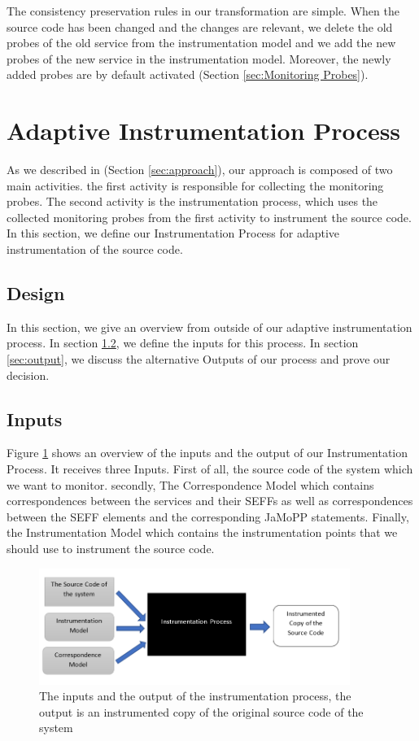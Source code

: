 The consistency preservation rules in our transformation are simple. When the source code has been changed and the changes are relevant, we delete the old probes of the old service from the instrumentation model and we add the new probes of the new service in the instrumentation model. Moreover, the newly added probes are by default activated (Section \ref{sec:Monitoring Probes}). 

\section{Adaptive Instrumentation Process}
\label{sec:Adaptive Instrumentation Process}
As we described in (Section \ref{sec:approach}), our approach is composed of two main activities. the first activity is responsible for collecting the monitoring probes. The second activity is the instrumentation process, which uses the collected monitoring probes from the first activity to instrument the source code. In this section, we define our Instrumentation Process for adaptive instrumentation of the source code.
 
\subsection{Design}
\label{sec:Design}
In this section, we give an overview from outside of our adaptive instrumentation process. In section \ref{sec:Inputs}, we define the inputs for this process. In section \ref{sec:output}, we discuss the alternative Outputs of our process and prove our decision. 
\subsection{Inputs}
\label{sec:Inputs}
Figure \ref{fig:approach_design} shows an overview of the inputs and the output of our Instrumentation Process. It receives three Inputs. First of all, the source code of the system which we want to monitor. secondly, The Correspondence Model which contains correspondences between the services and their SEFFs as well as correspondences between the SEFF elements and the corresponding JaMoPP statements. Finally, the Instrumentation Model which contains the instrumentation points that we should use to instrument the source code. 

\begin{figure}[h]
\centering
\includegraphics[width=0.9\textwidth]{figures/approach_design}
\caption{The inputs and the output of the instrumentation process, the output is an instrumented copy of the original source code of the system}
\label{fig:approach_design}
\end{figure}


